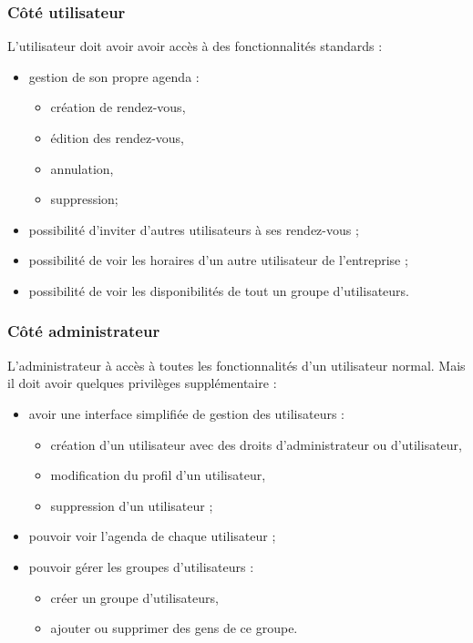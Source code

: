 \documentclass[a4paper, 11pt]{report}
\begin{document}
        \subsubsection{Côté utilisateur}
        L'utilisateur doit avoir avoir accès à des fonctionnalités standards :
        \begin{itemize}
            \item gestion de son propre agenda :
            \begin{itemize}
                \item création de rendez-vous,
                \item édition des rendez-vous,
                \item annulation,
                \item suppression;
            \end{itemize}
            \item possibilité d'inviter d'autres utilisateurs à ses rendez-vous ;
            \item possibilité de voir les horaires d'un autre utilisateur de l'entreprise ;
            \item possibilité de voir les disponibilités de tout un groupe d'utilisateurs.
        \end{itemize}
        \subsubsection{Côté administrateur}
        L'administrateur à accès à toutes les fonctionnalités d'un utilisateur normal. Mais il doit avoir quelques privilèges supplémentaire :
        \begin{itemize}
            \item avoir une interface simplifiée de gestion des utilisateurs :
            \begin{itemize}
                \item création d'un utilisateur avec des droits d'administrateur ou d'utilisateur,
                \item modification du profil d'un utilisateur,
                \item suppression d'un utilisateur ;
            \end{itemize}
            \item pouvoir voir l'agenda de chaque utilisateur ;
            \item pouvoir gérer les groupes d'utilisateurs :
            \begin{itemize}
                \item créer un groupe d'utilisateurs,
                \item ajouter ou supprimer des gens de ce groupe.
            \end{itemize}
        \end{itemize}
\end{document}
